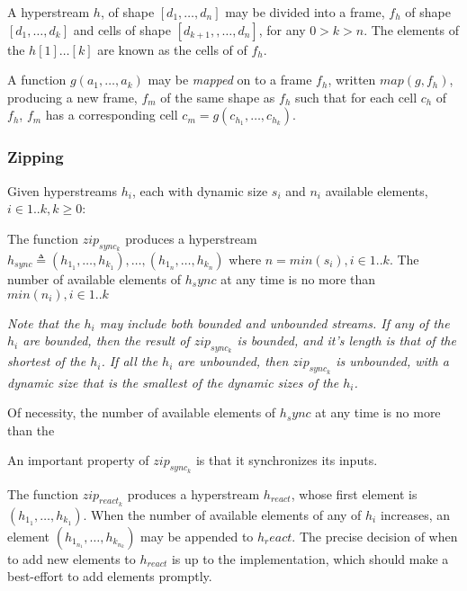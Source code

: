 \documentclass{article}
\begin{document}
A hyperstream $h$, of shape $[d_1, \ldots, d_n]$ may be divided into a frame, $f_h$ of shape $[d_1, \ldots, d_k]$ and cells of shape $[d_{k+1}, , \ldots, d_n]$, for any $0 > k > n$.
The elements of the $h[1] \ldots [k]$ are known as the cells of of $f_h$.

A function $g(a_1, \ldots, a_k)$ may be {\em mapped} on to a frame $f_h$, written $map(g, f_h)$, producing a new frame, $f_m$ of the same shape as $f_h$ such that for each cell $c_h$ of $f_h$, $f_m$ has a corresponding cell $c_m = g(c_{h_1}, \ldots, c_{h_k})$.

\subsubsection{Zipping}
\label{zipping}

Given hyperstreams $h_i$, each with dynamic size $s_i$ and $n_i$  available elements, $ i \in 1..k, k \ge 0$:

 The function $zip_{sync_k}$ produces a hyperstream $h_{sync} \triangleq (h_{1_1}, \ldots, h_{k_1}), \ldots, (h_{1_n}, \ldots, h_{k_n})$ where $n = min(s_i), i \in 1..k$.
 The number of available elements of $h_sync$ at any time is no more than $min(n_i), i \in 1..k$

{\em
Note that the $h_i$ may include both bounded and unbounded streams. If any of the $h_i$ are bounded, then the result of $zip_{sync_k}$ is bounded, and it's length is that of the shortest of the $h_i$. If all  the $h_i$ are unbounded, then $zip_{sync_k}$ is unbounded, with a dynamic size that is the smallest of the dynamic sizes of the $h_i$.

Of necessity, the number of available elements of $h_sync$ at any time is no more than the

An important property of $zip_{sync_k}$ is that it synchronizes its inputs.
}

The function $zip_{react_k}$  produces a hyperstream $h_{react}$, whose first element is $(h_{1_1}, \ldots, h_{k_1})$. When the number of available elements of any of $h_i$ increases, an element $(h_{1_{n_1}}, \ldots, h_{k_{n_k}})$ may be appended to $h_react$. The precise decision of when to add new elements to $h_{react}$ is up to the
implementation, which should make a best-effort to add elements promptly.
\end{document}
